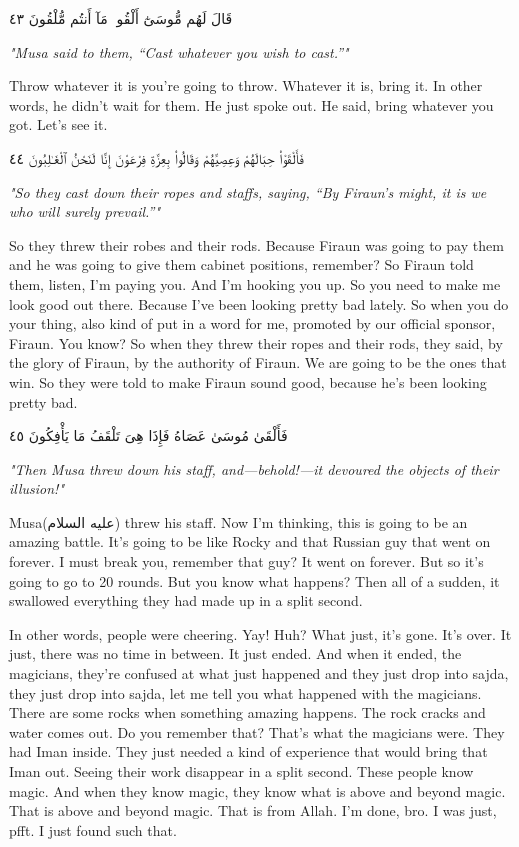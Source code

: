 \documentclass[12pt]{article}
\newcommand{\as}{\textarabic{(عليه السلام)}}
\begin{document}
\textarabic{قَالَ لَهُم مُّوسَىٰٓ أَلْقُوا۟ مَآ أَنتُم مُّلْقُونَ ٤٣}

\textit{"Musa said to them, “Cast whatever you wish to cast.”"}

Throw whatever it is you're going to throw. Whatever it is, bring it. In other words, he didn't wait for them. He just spoke out. He said, bring whatever you got. Let's see it. 

\textarabic{فَأَلْقَوْا۟ حِبَالَهُمْ وَعِصِيَّهُمْ وَقَالُوا۟ بِعِزَّةِ فِرْعَوْنَ إِنَّا لَنَحْنُ ٱلْغَـٰلِبُونَ ٤٤}

\textit{"So they cast down their ropes and staffs, saying, “By Firaun's might, it is we who will surely prevail.”"}

So they threw their robes and their rods. Because Firaun was going to pay them and he was going to give them cabinet positions, remember? So Firaun told them, listen, I'm paying you. And I'm hooking you up. So you need to make me look good out there. Because I've been looking pretty bad lately. So when you do your thing, also kind of put in a word for me, promoted by our official sponsor, Firaun. You know? So when they threw their ropes and their rods, they said, by the glory of Firaun, by the authority of Firaun. We are going to be the ones that win. So they were told to make Firaun sound good, because he's been looking pretty bad. 

\textarabic{فَأَلْقَىٰ مُوسَىٰ عَصَاهُ فَإِذَا هِىَ تَلْقَفُ مَا يَأْفِكُونَ ٤٥}

\textit{"Then Musa threw down his staff, and—behold!—it devoured the objects of their illusion!"}

Musa\as{} threw his staff. Now I'm thinking, this is going to be an amazing battle. It's going to be like Rocky and that Russian guy that went on forever. I must break you, remember that guy? It went on forever. But so it's going to go to 20 rounds. But you know what happens? Then all of a sudden, it swallowed everything they had made up in a split second. 

In other words, people were cheering. Yay! Huh? What just, it's gone. It's over. It just, there was no time in between. It just ended. And when it ended, the magicians, they're confused at what just happened and they just drop into sajda, they just drop into sajda, let me tell you what happened with the magicians. There are some rocks when something amazing happens. The rock cracks and water comes out. Do you remember that? That's what the magicians were. They had Iman inside. They just needed a kind of experience that would bring that Iman out. Seeing their work disappear in a split second. These people know magic. And when they know magic, they know what is above and beyond magic. That is above and beyond magic. That is from Allah. I'm done, bro. I was just, pfft. I just found such that. 
\end{document}
